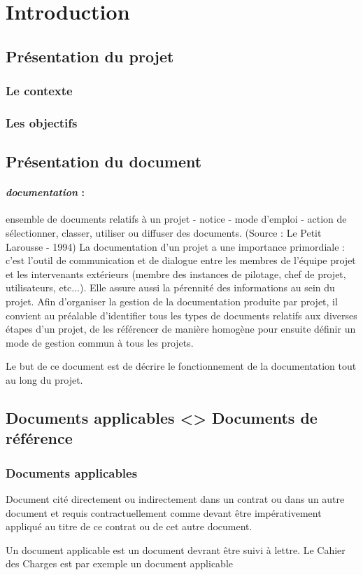 \section{Introduction}     
  \subsection{Présentation du projet}
    
    \subsubsection{Le contexte}     
     
    \subsubsection{Les objectifs}    
     
  \subsection{Présentation du document}
  
    \paragraph*{\textit{documentation} :}ensemble de documents relatifs à un projet - notice - mode d’emploi - action de sélectionner, classer, utiliser ou diffuser des documents. (Source : Le Petit Larousse - 1994)
    La documentation d’un projet a une importance primordiale : c’est l’outil de communication et de dialogue entre les membres de l’équipe projet et les intervenants extérieurs (membre des instances de pilotage, chef de projet, utilisateurs, etc...). Elle assure aussi la pérennité des informations au sein du projet.
    Afin d’organiser la gestion de la documentation produite par projet, il convient au préalable d’identifier tous les types de documents relatifs aux diverses étapes d’un projet, de les référencer de manière homogène pour ensuite définir un mode de gestion commun à tous les projets.
    \par Le but de ce document est de décrire le fonctionnement de la documentation tout au long du projet.
  
  \subsection{Documents applicables <> Documents de référence}
    \subsubsection{Documents applicables}
      Document cité directement ou indirectement dans un contrat ou dans un autre document et requis contractuellement comme devant être impérativement appliqué au titre de ce contrat ou de cet autre document.
      \par Un document applicable est un document devrant être suivi à lettre. Le Cahier des Charges est par exemple un document applicable
